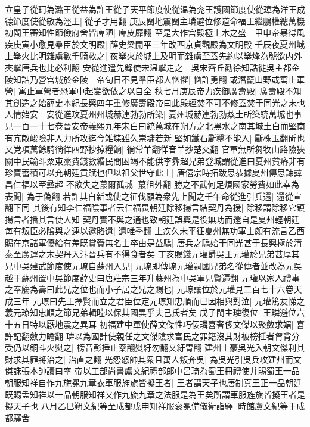 立皇子從珂為潞王從益為許王從子天平節度使從温為兖王護國節度使從璋為洋王成德節度使從敏為涇王|{
	從子才用翻}
庚辰閩地震閩主璘避位修道命福王繼鵬權總萬機初閩王審知性節儉府舍皆庳陋|{
	庳皮靡翻}
至是大作宫殿極土木之盛　甲申帝暴得風疾庚寅小愈見羣臣於文明殿|{
	薛史梁開平三年改西京貞觀殿為文明殿}
壬辰夜夏州城上舉火比明雜虜數千騎救之|{
	夜舉火於城上及明而雜虜至蓋先約以舉烽為號欲内外夾擊唐兵也比必利翻}
安從進遣先鋒使宋温擊走之　吳宋齊丘勸徐知誥徙吳主都金陵知誥乃營宫城於金陵　帝旬日不見羣臣都人忷懼|{
	忷許勇翻}
或潛竄山野或寓止軍營|{
	寓止軍營者恐軍中起變欲依之以自全}
秋七月庚辰帝力疾御廣壽殿|{
	廣壽殿不知其創造之始薛史本紀長興四年重修廣壽殿帝曰此殿經焚不可不修蓋焚于同光之末也}
人情始安　安從進攻夏州州城赫連勃勃所築|{
	夏州城赫連勃勃蒸土所築統萬城也事見一百一十七卷晉安帝義熙九年宋白曰統萬城在朔方之北黑水之南其城土白而堅南有亢敵峻險非人力所攻迄今雉堞雖久崇墉若新}
堅如鐵石斸鑿不能入|{
	斸株玉翻斫也}
又党項萬餘騎徜徉四野抄掠糧餉|{
	徜常羊翻徉音羊抄楚交翻}
官軍無所芻牧山路險狹關中民輸斗粟束藳費錢數緡民間困竭不能供李彞超兄弟登城謂從進曰夏州貧瘠非有珍寶蓄積可以充朝廷貢賦也但以祖父世守此土|{
	唐僖宗時拓跋思恭據夏州傳思諫彞昌仁福以至彞超}
不欲失之蕞爾孤城|{
	蕞徂外翻}
勝之不武何足煩國家勞費如此幸為表聞|{
	為于偽翻}
若許其自新或使之征伐願為衆先上聞之壬午命從進引兵還|{
	還從宣翻下同}
其後有知李仁福隂事者云仁福畏朝廷除移揚言結契丹為援|{
	除移謂除移它鎮揚言者播其言使人知}
契丹實不與之通也致朝廷誤興是役無功而還自是夏州輕朝廷每有叛臣必隂與之連以邀賂遺|{
	遺唯季翻}
上疾久未平征夏州無功軍士頗有流言乙酉賜在京諸軍優給有差既賞賚無名士卒由是益驕|{
	唐兵之驕始于同光甚于長興極於清泰至廣運之末契丹入汴晉兵有不得食者矣}
丁亥賜錢元瓘爵吳王元瓘於兄弟甚厚其兄中吳建武節度使元璙自蘇州入見|{
	元璙即傳璙元瓘嗣國兄弟名從傳者並改為元吳越于蘇州置中吳節度薛史曰唐莊宗三年升蘇州為中吳軍見賢遍翻}
元瓘以家人禮事之奉觴為壽曰此兄之位也而小子居之兄之賜也|{
	元璙讓位於元瓘見二百七十六卷天成三年}
元璙曰先王擇賢而立之君臣位定元璙知忠順而已因相與對泣|{
	元瓘篤友悌之義元璙知忠順之節兄弟輯睦以保其國異乎夫己氏者矣}
戊子閩主璘復位|{
	王璘避位六十五日特以厭地震之異耳}
初福建中軍使薛文傑性巧佞璘喜奢侈文傑以聚斂求媚|{
	喜許記翻斂力瞻翻}
璘以為國計使親任之文傑隂求富民之罪籍沒其財被榜捶者胷背分受仍以銅斗火熨之|{
	榜音彭捶止蘂翻熨紆勿翻又紆胃翻}
建州土豪吳光入朝文傑利其財求其罪將治之|{
	治直之翻}
光怨怒帥其衆且萬人叛奔吳|{
	為吳光引吳兵攻建州而文傑誅張本帥讀曰率}
帝以工部尚書盧文紀禮部郎中呂琦為蜀王冊禮使并賜蜀王一品朝服知祥自作九旒冕九章衣車服旌旗皆擬王者|{
	王者謂天子也唐制真王正一品朝廷既賜孟知祥以一品朝服知祥又作九旒九章之法服是為王矣所謂車服旌旗皆擬王者是擬天子也}
八月乙巳朔文紀等至成都戊申知祥服衮冕備儀衛詣驛|{
	時館盧文紀等于成都驛舍}

